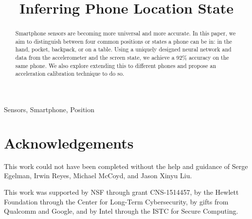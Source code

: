 \documentclass[conference]{IEEEtran}
\begin{document}
\title{Inferring Phone Location State}

\author{
\and
{}
\and
{}
\and
{}
}


\maketitle


\begin {abstract}Smartphone sensors are becoming more universal and more accurate. In this paper, we aim to distinguish between four common positions or states a phone can be in: in the hand, pocket, backpack, or on a table. Using a uniquely designed neural network and data from the accelerometer and the screen state, we achieve a 92\% accuracy on the same phone. We also explore extending this to different phones and propose an acceleration calibration technique to do so. 
\end{abstract}

\begin{IEEEkeywords}
Sensors, Smartphone, Position
\end{IEEEkeywords}








\section*{Acknowledgements}
This work could not have been completed without the help and guidance of Serge Egelman, Irwin Reyes, Michael McCoyd, and Jason Xinyu Liu.

This work was supported by NSF through grant CNS-1514457,
by the Hewlett Foundation through the Center for Long-Term Cybersecurity,
by gifts from Qualcomm and Google, and by Intel through the
ISTC for Secure Computing.

\nocite{}

\vfill

{\small
}
\end{document}
